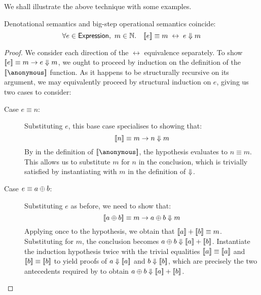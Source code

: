We shall illustrate the above technique with some examples.

\begin{theorem}\label{thm:denote-big}
Denotational semantics and big-step operational semantics coincide:
\[
	\forall e \in \Expression,\ m \in \Nat.\quad
		\sb[e] \equiv m \;\leftrightarrow\; e \Eval m
\]
\end{theorem}

\begin{proof}
We consider each direction of the $\leftrightarrow$ equivalence separately.
To show $\sb[e] \equiv m \rightarrow e \Eval m$, we ought to proceed by
induction on the definition of the $\sb[\anonymous]$ function. As it happens
to be structurally recursive on its argument, we may equivalently proceed by
structural induction on $e$, giving us two cases to consider:
\begin{description}
\item[Case $e \equiv n$:]%
Substituting $e$, this base case specialises to showing that:
\[
	\sb[n] \equiv m \rightarrow n \Eval m
\]
By  in the definition of $\sb[\anonymous]$, the
hypothesis evaluates to $n \equiv m$. This allows us to substitute $m$ for
$n$ in the conclusion, which is trivially satisfied by instantiating
 with $m$ in the definition of ${\Downarrow}$.
\item[Case $e \equiv a \oplus b$:]%
Substituting $e$ as before, we need to show that:
\[
	\sb[a \Add b] \equiv m \rightarrow a \Add b \Eval m
\]
Applying  once to the hypothesis, we obtain that $\sb[a]
+ \sb[b] \equiv m$. Substituting for $m$, the conclusion becomes $a \Add
b \Eval \sb[a] + \sb[b]$. Instantiate the induction hypothesis twice
with the trivial equalities $\sb[a] \equiv \sb[a]$ and $\sb[b] \equiv
\sb[b]$ to yield proofs of $a \Eval \sb[a]$ and $b \Eval \sb[b]$,
which are precisely the two antecedents required by  to
obtain $a \Add b \Eval \sb[a] + \sb [b]$.
\end{description}


\end{proof}
